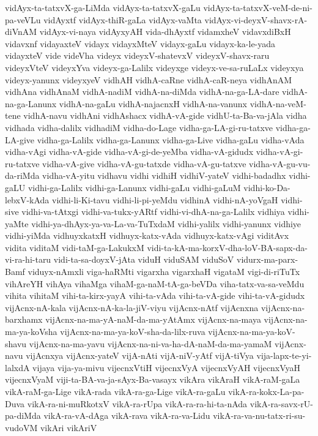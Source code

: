 {vidAyx-ta-tatxvX-ga-LiMda
vidAyx-ta-tatxvX-gaLu
vidAyx-ta-tatxvX-veM-de-ni-pa-veVLu
vidAyxtf
vidAyx-thiR-gaLa
vidAyx-vaMta
vidAyx-vi-deyxV-shavx-rA-diVnAM
vidAyx-vi-naya
vidAyxyAH
vida-dhAyxtf
vidamxheV
vidavxdiBxH
vidavxnf
vidayaxteV
vidayx
vidayxMteV
vidayx-gaLu
vidayx-ka-le-yada
vidayxteV
vide
videVha
videyx
videyxV-shatevxV
videyxV-shavx-raru
videyxVteV
videyxYva
videyx-ga-Lalilx
videyxge
videyx-ve-sa-ruLaLx
videyxya
videyx-yanunx
videyxyeV
vidhAH
vidhA-caRne
vidhA-caR-neya
vidhAnAM
vidhAna
vidhAnaM
vidhA-nadiM
vidhA-na-diMda
vidhA-na-ga-LA-dare
vidhA-na-ga-Lanunx
vidhA-na-gaLu
vidhA-najacnxH
vidhA-na-vanunx
vidhA-na-veM-tene
vidhA-navu
vidhAni
vidhAshacx
vidhA-vA-gide
vidhU-ta-Ba-va-jAla
vidha
vidhada
vidha-dalilx
vidhadiM
vidha-do-Lage
vidha-ga-LA-gi-ru-tatxve
vidha-ga-LA-give
vidha-ga-Lalilx
vidha-ga-Lanunx
vidha-ga-Live
vidha-gaLu
vidha-vAda
vidha-vAgi
vidha-vA-gide
vidha-vA-gi-de-yeMba
vidha-vA-gidudx
vidha-vA-gi-ru-tatxve
vidha-vA-give
vidha-vA-gu-tatxde
vidha-vA-gu-tatxve
vidha-vA-gu-vu-da-riMda
vidha-vA-yitu
vidhavu
vidhi
vidhiH
vidhiV-yateV
vidhi-badadhx
vidhi-gaLU
vidhi-ga-Lalilx
vidhi-ga-Lanunx
vidhi-gaLu
vidhi-gaLuM
vidhi-ko-Da-lebxV-kAda
vidhi-li-Ki-tavu
vidhi-li-pi-yeMdu
vidhinA
vidhi-nA-yoVgaH
vidhi-sive
vidhi-va-tAtxgi
vidhi-va-tukx-yARtf
vidhi-vi-dhA-na-ga-Lalilx
vidhiya
vidhi-yaMte
vidhi-ya-dhAyx-ya-va-La-va-TuTxdaM
vidhi-yalilx
vidhi-yanunx
vidhiye
vidhi-yiMda
vidhuyxkatxH
vidhuyx-katx-vAda
vidhuyx-katx-vAgi
viditAvx
vidita
viditaM
vidi-taM-ga-LakukxM
vidi-ta-kA-ma-korxV-dha-loV-BA-sapx-da-vi-ra-hi-taru
vidi-ta-sa-doyxV-jAta
viduH
viduSAM
viduSoV
vidurx-ma-parx-Bamf
viduyx-nAmxli
viga-haRMti
vigarxha
vigarxhaH
vigataM
vigi-di-riTuTx
vihAreYH
vihAya
vihaMga
vihaM-ga-naM-tA-ga-beVDa
viha-tatx-va-sa-veMdu
vihita
vihitaM
vihi-ta-kirx-yayA
vihi-ta-vAda
vihi-ta-vA-gide
vihi-ta-vA-gidudx
vijAcnx-nA-kala
vijAcnx-nA-ka-la-jiV-viyu
vijAcnx-nAtf
vijAcnxna
vijAcnx-na-barxhamx
vijAcnx-na-ma-yA-naM-da-ma-yAtAmx
vijAcnx-na-maya
vijAcnx-na-ma-ya-koVsha
vijAcnx-na-ma-ya-koV-sha-da-lilx-ruva
vijAcnx-na-ma-ya-koV-shavu
vijAcnx-na-ma-yavu
vijAcnx-na-ni-va-ha-dA-naM-da-ma-yamaM
vijAcnx-navu
vijAcnxya
vijAcnx-yateV
vijA-nAti
vijA-niV-yAtf
vijA-tiVya
vija-lapx-te-yi-lalxdA
vijaya
vija-ya-mivu
vijecnxVtiH
vijecnxVyA
vijecnxVyAH
vijecnxVyaH
vijecnxVyaM
viji-ta-BA-va-ja-sAyx-Ba-vasayx
vikAra
vikAraH
vikA-raM-gaLa
vikA-raM-ga-Lige
vikA-rada
vikA-ra-ga-Lige
vikA-ra-gaLu
vikA-ra-kokx-La-pa-Duva
vikA-ra-ni-muRkotxV
vikA-ra-rUpa
vikA-ra-ra-hi-ta-nAda
vikA-ra-savx-rU-pa-diMda
vikA-ra-vA-dAga
vikA-rava
vikA-ra-va-Lidu
vikA-ra-va-nu-tatx-ri-su-vudoVM
vikAri
vikAriV
}
